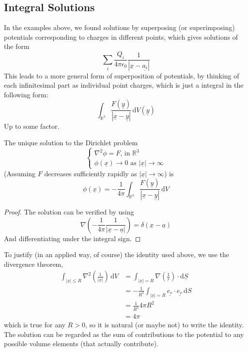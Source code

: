 \subsection{Integral Solutions}
In the examples above, we found solutions by superposing (or superimposing) potentials corresponding to charges in different points, which gives solutions of the form
$$\sum_i\frac{Q_i}{4\pi\epsilon_0}\frac{1}{|\underline{x}-\underline{a_i}|}$$
This leads to a more general form of superposition of potentials, by thinking of each infinitesimal part as individual point charges, which is just a integral in the following form:
$$\int_{\mathbb R^3}\frac{F(\underline{y})}{|\underline{x}-\underline{y}|}\,\mathrm dV(\underline{y})$$
Up to some factor.
\begin{proposition}
    The unique solution to the Dirichlet problem
    $$\begin{cases}
        \nabla^2\phi=F\text{, in $\mathbb R^3$}\\
        \phi(\underline{x})\to 0\text{ as $|\underline{x}|\to\infty$}
    \end{cases}$$
    (Assuming $F$ decreases sufficiently rapidly as $|\underline{x}|\to\infty$) is
    $$\phi(\underline{x})=-\frac{1}{4\pi}\int_{\mathbb R^3}\frac{F(\underline{y})}{|\underline{x}-\underline{y}|}\,\mathrm dV$$
\end{proposition}
\begin{proof}
    The solution can be verified by using
    $$\nabla\left( -\frac{1}{4\pi}\frac{1}{|\underline{x}-\underline{a}|} \right)=\delta(\underline{x}-\underline{a})$$
    And differentiating under the integral sign.
\end{proof}
To justify (in an applied way, of course) the identity used above, we use the divergence theorem,
\begin{align*}
    \int_{|\underline{x}|\le R}\nabla^2\left( \frac{1}{|\underline{x}|} \right)\,\mathrm dV&=\int_{|\underline{x}|=R}\nabla\left( \frac{1}{r} \right)\cdot\mathrm d\underline{S}\\
    &=-\frac{1}{R^2}\int_{|\underline{x}|=R}\underline{e_r}\cdot\underline{e_r}\,\mathrm dS\\
    &=\frac{1}{R^2}4\pi R^2\\
    &=4\pi
\end{align*}
which is true for any $R>0$, so it is natural (or maybe not) to write the identity.\\
The solution can be regarded as the sum of contributions to the potential to any possible volume elements (that actually contribute).
